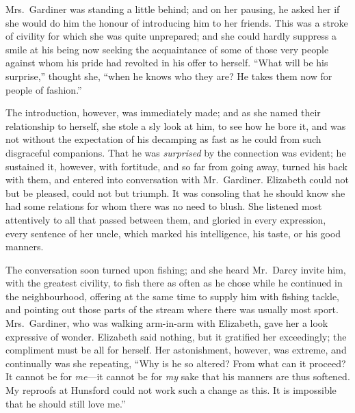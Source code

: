\documentclass[12pt,english]{book}
\begin{document}
Mrs.\ Gardiner was standing a little behind; and on her pausing,
he asked her if she would do him the honour of introducing him to
her friends. This was a stroke of civility for which she was quite
unprepared; and she could hardly suppress a smile at his being now
seeking the acquaintance of some of those very people against whom
his pride had revolted in his offer to herself. {}``What will be
his surprise,'' thought she, {}``when he knows who they are? He
takes them now for people of fashion.''

The introduction, however, was immediately made; and as she named
their relationship to herself, she stole a sly look at him, to see
how he bore it, and was not without the expectation of his decamping
as fast as he could from such disgraceful companions. That he was
\textit{surprised} by the connection was evident; he sustained it,
however, with fortitude, and so far from going away, turned his back
with them, and entered into conversation with Mr.\ Gardiner. Elizabeth
could not but be pleased, could not but triumph. It was consoling
that he should know she had some relations for whom there was no need
to blush. She listened most attentively to all that passed between
them, and gloried in every expression, every sentence of her uncle,
which marked his intelligence, his taste, or his good manners.

The conversation soon turned upon fishing; and she heard Mr.\ Darcy
invite him, with the greatest civility, to fish there as often as
he chose while he continued in the neighbourhood, offering at the
same time to supply him with fishing tackle, and pointing out those
parts of the stream where there was usually most sport. Mrs.\ Gardiner,
who was walking arm-in-arm with Elizabeth, gave her a look expressive
of wonder. Elizabeth said nothing, but it gratified her exceedingly;
the compliment must be all for herself. Her astonishment, however,
was extreme, and continually was she repeating, {}``Why is he so
altered? From what can it proceed? It cannot be for \textit{me}---it
cannot be for \textit{my} sake that his manners are thus softened.
My reproofs at Hunsford could not work such a change as this. It is
impossible that he should still love me.''
\end{document}

